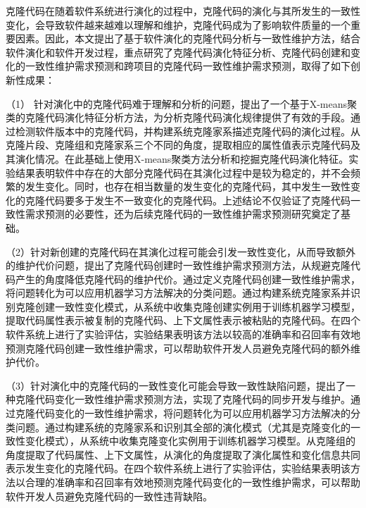 

克隆代码在随着软件系统进行演化的过程中，克隆代码的演化与其所发生的一致性变化，会导致软件越来越难以理解和维护，克隆代码成为了影响软件质量的一个重要因素。因此，本文提出了基于软件演化的克隆代码分析与一致性维护方法，结合软件演化和软件开发过程，重点研究了克隆代码演化特征分析、克隆代码创建和变化的一致性维护需求预测和跨项目的克隆代码一致性维护需求预测，取得了如下创新性成果：

（1） 针对演化中的克隆代码难于理解和分析的问题，提出了一个基于X-means聚类的克隆代码演化特征分析方法，为分析克隆代码演化规律提供了有效的手段。通过检测软件版本中的克隆代码，并构建系统克隆家系描述克隆代码的演化过程。从克隆片段、克隆组和克隆家系三个不同的角度，提取相应的属性值表示克隆代码及其演化情况。在此基础上使用X-means聚类方法分析和挖掘克隆代码演化特征。实验结果表明软件中存在的大部分克隆代码在其演化过程中是较为稳定的，并不会频繁的发生变化。同时，也存在相当数量的发生变化的克隆代码，其中发生一致性变化的克隆代码要多于发生不一致变化的克隆代码。上述结论不仅验证了克隆代码一致性需求预测的必要性，还为后续克隆代码的一致性维护需求预测研究奠定了基础。

（2）针对新创建的克隆代码在其演化过程可能会引发一致性变化，从而导致额外的维护代价问题，提出了克隆代码创建时一致性维护需求预测方法，从规避克隆代码产生的角度降低克隆代码的维护代价。通过定义克隆代码创建一致性维护需求，将问题转化为可以应用机器学习方法解决的分类问题。通过构建系统克隆家系并识别克隆创建一致性变化模式，从系统中收集克隆创建实例用于训练机器学习模型，提取代码属性表示被复制的克隆代码、上下文属性表示被粘贴的克隆代码。在四个软件系统上进行了实验评估，实验结果表明该方法以较高的准确率和召回率有效地预测克隆代码创建一致性维护需求，可以帮助软件开发人员避免克隆代码的额外维护代价。

（3）针对演化中的克隆代码的一致性变化可能会导致一致性缺陷问题，提出了一种克隆代码变化一致性维护需求预测方法，实现了克隆代码的同步开发与维护。通过克隆代码变化的一致性维护需求，将问题转化为可以应用机器学习方法解决的分类问题。通过构建系统的克隆家系和识别其全部的演化模式（尤其是克隆变化的一致性变化模式），从系统中收集克隆变化实例用于训练机器学习模型。从克隆组的角度提取了代码属性、上下文属性，从演化的角度提取了演化属性和变化信息共同表示发生变化的克隆代码。在四个软件系统上进行了实验评估，实验结果表明该方法以合理的准确率和召回率有效地预测克隆代码变化的一致性维护需求，可以帮助软件开发人员避免克隆代码的一致性违背缺陷。

